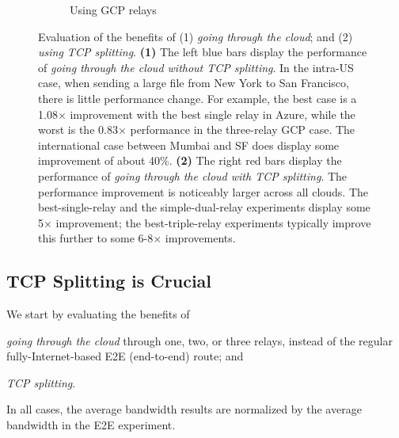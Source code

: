 \documentclass{hotnets17}
\newcommand{\mycomm}[3]{{\color{#2} \textbf{[#1: #3]}}}
\newcommand{\mycomm}[3]{}
\newcommand{\IK}[1]{\mycomm{IK}{blue}{#1}}
\newcommand{\AB}[1]{\mycomm{AB}{Orange}{#1}}
\newcommand{\NR}[1]{\mycomm{NR}{OliveGreen}{#1}}
\begin{document}
\begin{figure}[t!]
\begin{subfigure}{.32\textwidth}
    \caption{Using GCP relays}
    \label{fig:must-split-gcp}
\end{subfigure}
\caption{Evaluation of the benefits of (1) \textit{going through the cloud}; and (2) \textit{using TCP splitting}. \textbf{(1)} The left blue bars display the performance of \textit{going through the cloud without TCP splitting}. In the intra-US case, when sending a large file from New York to San Francisco, there is little performance change. For example, the best case is a 1.08$\times$ improvement with the best single relay in Azure, while the worst is the 0.83$\times$ performance in the three-relay GCP case. The international case between Mumbai and SF does display some improvement of about 40\%. \textbf{(2)} The right red bars display the performance of \textit{going through the cloud with TCP splitting}. The performance improvement is noticeably larger across all clouds. The best-single-relay and the simple-dual-relay experiments display some 5$\times$ improvement; the best-triple-relay experiments typically improve this further to some 6-8$\times$ improvements.
}
\label{fig:must-split}
\end{figure}


\subsection{TCP Splitting is Crucial} 

We start by evaluating the benefits of 
\begin{inlinelist}
    \item \textit{going through the cloud} through one, two, or three relays,  instead of the regular fully-Internet-based E2E (end-to-end) route; and \item \textit{TCP splitting}.
\end{inlinelist} In all cases, the average bandwidth results are normalized by the average bandwidth in the E2E experiment.
\end{document}
